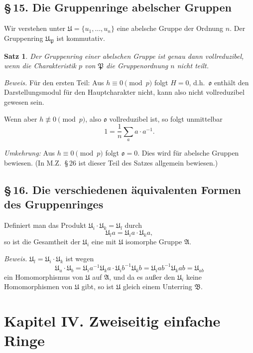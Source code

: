 \documentclass[10pt,a4paper]{article}
\theoremstyle{plain}
\newtheorem{satz}{Satz}[section]
\theoremstyle{definition}
\theoremstyle{remark}
\begin{document}
\subsection*{\S\,15. Die Gruppenringe abelscher Gruppen}

Wir verstehen unter $\mathfrak{U} = \{u_1, \ldots, u_n\}$ eine abelsche Gruppe der Ordnung $n$. Der Gruppenring $\mathfrak{U}_\mathfrak{P}$ ist kommutativ.

\begin{satz}
Der Gruppenring einer abelschen Gruppe ist genau dann vollreduzibel, wenn die Charakteristik $p$ von $\mathfrak{P}$ die Gruppenordnung $n$ nicht teilt.
\end{satz}

\textit{Beweis.} F\"ur den ersten Teil: Aus $h \equiv 0 \pmod{p}$ folgt $H = 0$, d.h.\ $\mathfrak{o}$ enth\"alt den Darstellungsmodul f\"ur den Hauptcharakter nicht, kann also nicht vollreduzibel gewesen sein.

Wenn aber $h \not\equiv 0 \pmod{p}$, also $\mathfrak{o}$ vollreduzibel ist, so folgt unmittelbar
\[
1 = \frac{1}{n} \sum_a a \cdot a^{-1}.
\]

\textit{Umkehrung:} Aus $h \equiv 0 \pmod{p}$ folgt $\mathfrak{o} = 0$. Dies wird f\"ur abelsche Gruppen bewiesen. (In M.Z.\ \S\,26 ist dieser Teil des Satzes allgemein bewiesen.)

\subsection*{\S\,16. Die verschiedenen \"aquivalenten Formen des Gruppenringes}

Definiert man das Produkt $\mathfrak{U}_i \cdot \mathfrak{U}_k = \mathfrak{U}_l$ durch
\[
\mathfrak{U}_l a = \mathfrak{U}_i a \cdot \mathfrak{U}_k a,
\]
so ist die Gesamtheit der $\mathfrak{U}_i$ eine mit $\mathfrak{U}$ isomorphe Gruppe $\mathfrak{A}$.

\textit{Beweis.} $\mathfrak{U}_l = \mathfrak{U}_i \cdot \mathfrak{U}_k$ ist wegen
\[
\mathfrak{U}_a \cdot \mathfrak{U}_b = \mathfrak{U}_i a^{-1} \mathfrak{U}_k a \cdot \mathfrak{U}_i b^{-1} \mathfrak{U}_k b = \mathfrak{U}_i ab^{-1} \mathfrak{U}_k ab = \mathfrak{U}_{ab}
\]
ein Homomorphismus von $\mathfrak{U}$ auf $\mathfrak{A}$, und da es au\ss er den $\mathfrak{U}_i$ keine Homomorphismen von $\mathfrak{U}$ gibt, so ist $\mathfrak{U}$ gleich einem Unterring $\mathfrak{B}$.

\newpage
\section*{Kapitel IV. Zweiseitig einfache Ringe}
\end{document}
